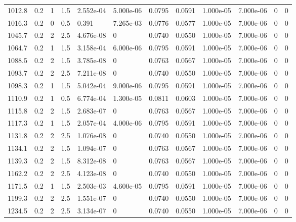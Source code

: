\documentclass[preview]{standalone}
\begin{document}
{{{\begin{tabular}{L{1.2cm}C{1.2cm} C{0.3cm}C{0.5cm} C{1.4cm}C{1.4cm} C{1.4cm}C{1.4cm} C{1.6cm}C{1.6cm} C{1.6cm}C{1.6cm}}
  1012.8  &   0.2  & 1     & 1.5 &  2.552e-04  & 5.000e-06  &  0.0795&   0.0591& 1.000e-05 & 7.000e-06   &  0 & 0  \\ 
  1016.3  &   0.2  & 0     & 0.5 &  0.391  & 7.265e-03  &  0.0776&   0.0577& 1.000e-05 & 7.000e-06   &  0 & 0  \\ 
  1045.7  &   0.2  & 2     & 2.5 &  4.676e-08  & 0  &  0.0740&   0.0550& 1.000e-05 & 7.000e-06   &  0 & 0  \\ 
  1064.7  &   0.2  & 1     & 1.5 &  3.158e-04  & 6.000e-06  &  0.0795&   0.0591& 1.000e-05 & 7.000e-06   &  0 & 0  \\ 
  1088.5  &   0.2  & 2     & 1.5 &  3.785e-08  & 0  &  0.0763&   0.0567& 1.000e-05 & 7.000e-06   &  0 & 0  \\ 
  1093.7  &   0.2  & 2     & 2.5 &  7.211e-08  & 0  &  0.0740&   0.0550& 1.000e-05 & 7.000e-06   &  0 & 0  \\ 
  1098.3  &   0.2  & 1     & 1.5 &  5.042e-04  & 9.000e-06  &  0.0795&   0.0591& 1.000e-05 & 7.000e-06   &  0 & 0  \\ 
  1110.9  &   0.2  & 1     & 0.5 &  6.774e-04  & 1.300e-05  &  0.0811&   0.0603& 1.000e-05 & 7.000e-06   &  0 & 0  \\ 
  1115.8  &   0.2  & 2     & 1.5 &  2.683e-07  & 0  &  0.0763&   0.0567& 1.000e-05 & 7.000e-06   &  0 & 0  \\ 
  1117.3  &   0.2  & 1     & 1.5 &  2.057e-04  & 4.000e-06  &  0.0795&   0.0591& 1.000e-05 & 7.000e-06   &  0 & 0  \\ 
  1131.8  &   0.2  & 2     & 2.5 &  1.076e-08  & 0  &  0.0740&   0.0550& 1.000e-05 & 7.000e-06   &  0 & 0  \\ 
  1134.1  &   0.2  & 2     & 1.5 &  1.094e-07  & 0  &  0.0763&   0.0567& 1.000e-05 & 7.000e-06   &  0 & 0  \\ 
  1139.3  &   0.2  & 2     & 1.5 &  8.312e-08  & 0  &  0.0763&   0.0567& 1.000e-05 & 7.000e-06   &  0 & 0  \\ 
  1162.2  &   0.2  & 2     & 2.5 &  4.123e-08  & 0  &  0.0740&   0.0550& 1.000e-05 & 7.000e-06   &  0 & 0  \\ 
  1171.5  &   0.2  & 1     & 1.5 &  2.503e-03  & 4.600e-05  &  0.0795&   0.0591& 1.000e-05 & 7.000e-06   &  0 & 0  \\ 
  1199.3  &   0.2  & 2     & 2.5 &  1.551e-07  & 0  &  0.0740&   0.0550& 1.000e-05 & 7.000e-06   &  0 & 0  \\ 
  1234.5  &   0.2  & 2     & 2.5 &  3.134e-07  & 0  &  0.0740&   0.0550& 1.000e-05 & 7.000e-06   &  0 & 0  \\ 

\end{tabular}}}}
\end{document}
